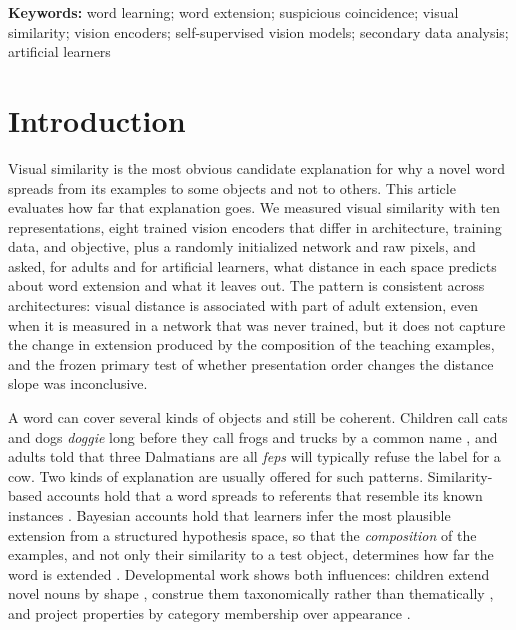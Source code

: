 \documentclass[11pt]{article}
\begin{document}
\vspace{-0.6em}
\noindent\textbf{Keywords:} word learning; word extension; suspicious coincidence; visual similarity; vision encoders; self-supervised vision models; secondary data analysis; artificial learners

\section{Introduction}

Visual similarity is the most obvious candidate explanation for why a novel word spreads from its examples to some objects and not to others. This article evaluates how far that explanation goes. We measured visual similarity with ten representations, eight trained vision encoders that differ in architecture, training data, and objective, plus a randomly initialized network and raw pixels, and asked, for adults and for artificial learners, what distance in each space predicts about word extension and what it leaves out. The pattern is consistent across architectures: visual distance is associated with part of adult extension, even when it is measured in a network that was never trained, but it does not capture the change in extension produced by the composition of the teaching examples, and the frozen primary test of whether presentation order changes the distance slope was inconclusive.

A word can cover several kinds of objects and still be coherent. Children call cats and dogs \emph{doggie} long before they call frogs and trucks by a common name \parencite{rescorla1980}, and adults told that three Dalmatians are all \emph{feps} will typically refuse the label for a cow. Two kinds of explanation are usually offered for such patterns. Similarity-based accounts hold that a word spreads to referents that resemble its known instances \parencite{sloutsky2004,nosofsky1986}. Bayesian accounts hold that learners infer the most plausible extension from a structured hypothesis space, so that the \emph{composition} of the examples, and not only their similarity to a test object, determines how far the word is extended \parencite{xu2007}. Developmental work shows both influences: children extend novel nouns by shape \parencite{landau1988}, construe them taxonomically rather than thematically \parencite{markman1984}, and project properties by category membership over appearance \parencite{gelman1986}.
\end{document}
